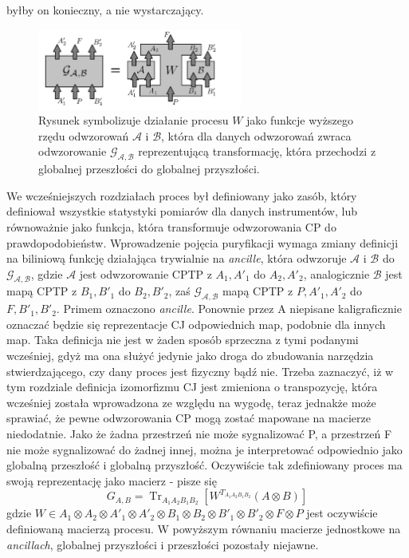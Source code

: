 \documentclass[10pt]{article} %
\DeclareMathOperator{\Trs}{Tr}
\begin{document}
byłby on konieczny, a nie wystarczający. 
\begin{figure}[t]
\centering
\includegraphics[width=0.6\textwidth]{obrazki/done1}
\caption{
Rysunek symbolizuje działanie procesu $W$ jako funkcje wyższego rzędu odwzorowań $\mathcal{A}$ i $\mathcal{B}$, która dla danych odwzorowań zwraca odwzorowanie 
$\mathcal{G_{A,B}}$ reprezentującą transformację, która przechodzi z globalnej przeszłości do globalnej przyszłości.
}
\label{higherordermap}
\end{figure}
We wcześniejszych rozdziałach proces był definiowany jako zasób, który definiował wszystkie statystyki pomiarów dla danych instrumentów, lub równoważnie jako funkcja, która transformuje odwzorowania CP do prawdopodobieństw. Wprowadzenie pojęcia puryfikacji wymaga zmiany definicji na biliniową funkcję działająca trywialnie na \textit{ancille}, która odwzoruje
$\mathcal{A}$ i $\mathcal{B}$ do $\mathcal{G_{A,B}}$, gdzie $\mathcal{A}$ jest odwzorowanie CPTP z $A_1, A'_1$ do $A_2, A'_2$, analogicznie $\mathcal{B}$ jest mapą CPTP z
$B_1, B'_1$ do $B_2, B'_2$, zaś $\mathcal{G_{A,B}}$ mapą CPTP z $P, A'_1, A'_2$ do $F, B'_1, B'_2$. Primem oznaczono \textit{ancille}. Ponownie przez A niepisane kaligraficznie oznaczać będzie się reprezentacje CJ odpowiednich map, podobnie dla innych map. Taka definicja nie jest w żaden sposób sprzeczna z tymi podanymi wcześniej, gdyż ma ona służyć jedynie jako droga do zbudowania narzędzia stwierdzającego, czy dany proces jest fizyczny bądź nie. Trzeba zaznaczyć, iż w tym rozdziale definicja izomorfizmu CJ jest zmieniona o transpozycję, która wcześniej została wprowadzona ze względu na wygodę, teraz jednakże może sprawiać, że pewne odwzorowania CP 
mogą zostać mapowane na macierze niedodatnie. Jako że żadna przestrzeń nie może sygnalizować P, a przestrzeń F nie może sygnalizować do żadnej innej,
można je interpretować odpowiednio jako globalną przeszłość i globalną przyszłość. Oczywiście tak zdefiniowany proces ma swoją reprezentację jako macierz - pisze się
\begin{equation}
\label{eq:longnp}
G_{A,B} = \Trs_{A_1A_2B_1B_2} \left[ W^{T_{A_1A_2B_1B_2}} (A\otimes B)\right]
\end{equation}
gdzie $W \in A_1 \otimes A_2 \otimes A'_1 \otimes A'_2 \otimes B_1 \otimes B_2 \otimes B'_1 \otimes B'_2 \otimes F \otimes P$ jest oczywiście definiowaną macierzą procesu. W powyższym równaniu macierze jednostkowe na \textit{ancillach}, globalnej przyszłości i przeszłości pozostały niejawne.
\end{document}
